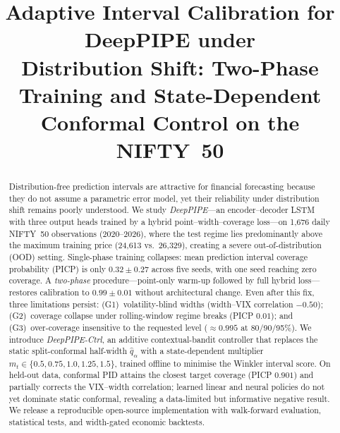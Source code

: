 \documentclass[conference]{IEEEtran}
\newcommand{\qhat}{\hat{q}_{\alpha}}
\begin{document}
\title{Adaptive Interval Calibration for DeepPIPE under\\
Distribution Shift: Two-Phase Training and State-Dependent\\
Conformal Control on the NIFTY~50}

\author{%
\and
{}
\and
{}
}

\maketitle

\begin{abstract}
Distribution-free prediction intervals are attractive for financial forecasting because they do
not assume a parametric error model, yet their reliability under distribution shift remains
poorly understood. We study \emph{DeepPIPE}---an encoder--decoder LSTM with three output heads
trained by a hybrid point--width--coverage loss---on 1{,}676 daily NIFTY~50 observations
(2020--2026), where the test regime lies predominantly above the maximum training price
(24{,}613 vs.\ 26{,}329), creating a severe out-of-distribution (OOD) setting. Single-phase
training collapses: mean prediction interval coverage probability (PICP) is only
$0.32\pm0.27$ across five seeds, with one seed reaching zero coverage. A \emph{two-phase}
procedure---point-only warm-up followed by full hybrid loss---restores calibration to
$0.99\pm0.01$ without architectural change. Even after this fix, three limitations persist:
(G1)~volatility-blind widths (width--VIX correlation $-0.50$); (G2)~coverage collapse under
rolling-window regime breaks (PICP $0.01$); and (G3)~over-coverage insensitive to the requested
level ($\approx0.995$ at 80/90/95\%). We introduce \emph{DeepPIPE-Ctrl}, an additive
contextual-bandit controller that replaces the static split-conformal half-width $\qhat$ with a
state-dependent multiplier $m_t\in\{0.5,0.75,1.0,1.25,1.5\}$, trained offline to minimise the
Winkler interval score. On held-out data, conformal PID attains the closest target coverage
(PICP $0.901$) and partially corrects the VIX--width correlation; learned linear and neural
policies do not yet dominate static conformal, revealing a data-limited but informative negative
result. We release a reproducible open-source implementation with walk-forward evaluation,
statistical tests, and width-gated economic backtests.
\end{abstract}
\end{document}
